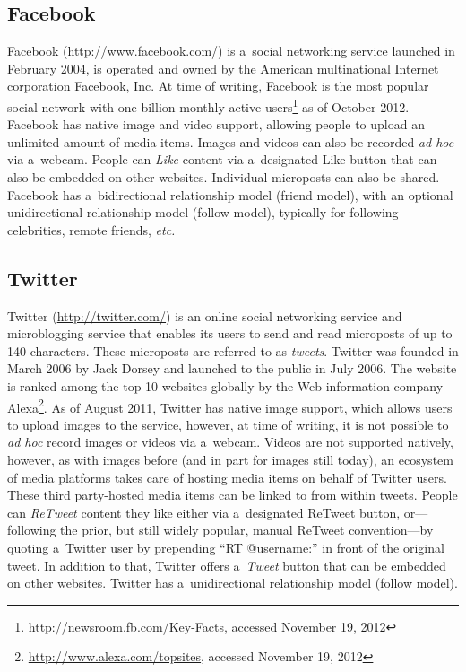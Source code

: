 \subsection{Facebook}

Facebook (\url{http://www.facebook.com/})
is a~social networking service launched in February 2004,
is operated and owned by the American multinational
Internet corporation Facebook, Inc.
At time of writing, Facebook is the most popular social network
with one billion monthly active
users\footnote{\url{http://newsroom.fb.com/Key-Facts},
accessed November 19, 2012}
as of October 2012.
Facebook has native image and video support,
allowing people to upload an unlimited amount of media items.
Images and videos can also be recorded \emph{ad hoc} via a~webcam.
People can \emph{Like} content via a~designated Like button
that can also be embedded on other websites.
Individual microposts can also be shared.
Facebook has a~bidirectional relationship model (friend model),
with an optional unidirectional relationship model (follow model),
typically for following celebrities, remote friends, \emph{etc.}

\subsection{Twitter}
\label{sec:twitter}

Twitter (\url{http://twitter.com/})
is an online social networking service
and microblogging service
that enables its users to send and read microposts
of up to 140 characters.
These microposts are referred to as \emph{tweets}.
Twitter was founded in March 2006 by Jack Dorsey
and launched to the public in July 2006.
The website is ranked among the top-10 websites globally
by the Web information company
Alexa\footnote{\url{http://www.alexa.com/topsites},
accessed November 19, 2012}.
As of August 2011, Twitter has native image support,
which allows users to upload images to the service, however,
at time of writing, it is not possible to \emph{ad hoc}
record images or videos via a~webcam.
Videos are not supported natively, however,
as with images before (and in part for images still today),
an ecosystem of media platforms takes care of
hosting media items on behalf of Twitter users.
These third party-hosted media items
can be linked to from within tweets.
People can \emph{ReTweet} content they like either
via a~designated ReTweet button,
or---following the prior, but still widely popular, manual ReTweet convention---by
quoting a~Twitter user by prepending ``RT @username:''
in front of the original tweet.
In addition to that, Twitter offers a~\emph{Tweet} button that can be embedded on other websites.
Twitter has a~unidirectional relationship model (follow model).

